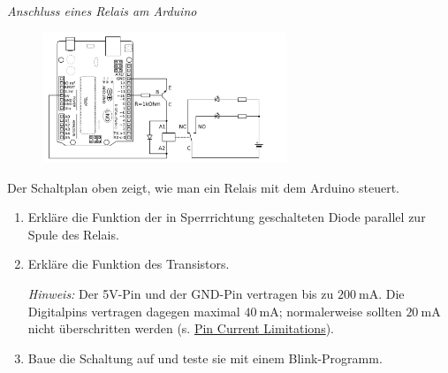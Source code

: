 \newpage
\begin{aufgabe}\emph{Anschluss eines Relais am Arduino}
	\vspace{-0.5\baselineskip}
	\begin{figure}[H]
		\centering
		\includegraphics[width=0.65\textwidth]{./Zeichnungen/relais-schaltung-mit-arduino.png}
	\end{figure}
	\vspace{-0.5\baselineskip}
	Der Schaltplan oben zeigt, wie man ein Relais mit dem Arduino steuert.
	\begin{enumerate}[itemsep=0mm, parsep=0mm, label=\alph*)]
		\item Erkläre die Funktion der in Sperrrichtung geschalteten Diode parallel zur Spule des Relais.
		\item Erkläre die Funktion des Transistors.
		
		\emph{Hinweis:} Der 5V-Pin und der GND-Pin vertragen bis zu $\SI{200}{\milli\ampere}$. Die Digitalpins vertragen dagegen maximal $\SI{40}{\milli\ampere}$; normalerweise sollten $\SI{20}{\milli\ampere}$ nicht überschritten werden (s. \href{https://playground.arduino.cc/Main/ArduinoPinCurrentLimitations/}{Pin Current Limitations}).
		\item Baue die Schaltung auf und teste sie mit einem Blink-Programm.
	\end{enumerate}
\end{aufgabe}


